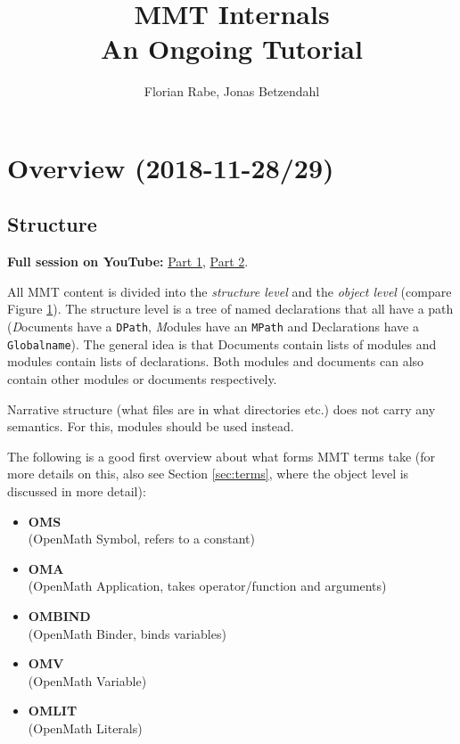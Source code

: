 \documentclass[11pt,a4paper]{article}
\author{Florian Rabe, Jonas Betzendahl}
\title{MMT Internals\\ An Ongoing Tutorial}
\newcommand{\MMT}{\textsf{MMT}\xspace}
\begin{document}
\maketitle
\tableofcontents
\bigskip

\section{Overview (2018-11-28/29)}
\label{sec:overview}

\subsection{Structure}

\textbf{Full session on YouTube:} \href{https://www.youtube.com/watch?v=PUKjQbbeqdQ}{Part 1}, \href{https://www.youtube.com/watch?v=yh_vwVm8Szc}{Part 2}.
\bigskip

All \MMT content is divided into the \emph{structure level} and the \emph{object level} (compare Figure \ref{fig:mmtcontent}). The structure level is a tree of named declarations that all have a path (\emph{D}ocuments have a \texttt{DPath}, \emph{M}odules have an \texttt{MPath} and Declarations have a \texttt{Globalname}). The general idea is that Documents contain lists of modules and modules contain lists of declarations. Both modules and documents can also contain  other modules or documents respectively.

\begin{figure}[h]
\centering
\label{fig:mmtcontent}
\end{figure}

Narrative structure (what files are in what directories etc.) does not carry any semantics. For this, modules should be used instead.

The following is a good first overview about what forms \MMT terms take (for more details on this, also see Section \ref{sec:terms}, where the object level is discussed in more detail):

\begin{itemize}
\item \textbf{OMS}\\ (OpenMath Symbol, refers to a constant)
\item \textbf{OMA}\\ (OpenMath Application, takes operator/function and arguments)
\item \textbf{OMBIND}\\ (OpenMath Binder, binds variables)
\item \textbf{OMV}\\ (OpenMath Variable)
\item \textbf{OMLIT}\\ (OpenMath Literals)
\end{itemize}
\end{document}
